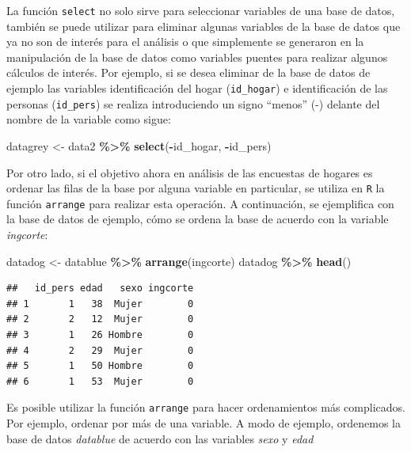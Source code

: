 \documentclass[
  12pt,
]{book}
\newenvironment{Shaded}{\begin{snugshade}}{\end{snugshade}}
\newcommand{\FunctionTok}[1]{\textcolor[rgb]{0.13,0.29,0.53}{\textbf{#1}}}
\newcommand{\NormalTok}[1]{#1}
\newcommand{\OtherTok}[1]{\textcolor[rgb]{0.56,0.35,0.01}{#1}}
\newcommand{\SpecialCharTok}[1]{\textcolor[rgb]{0.81,0.36,0.00}{\textbf{#1}}}
\begin{document}
La función \texttt{select} no solo sirve para seleccionar variables de una base de datos, también se puede utilizar para eliminar algunas variables de la base de datos que ya no son de interés para el análisis o que simplemente se generaron en la manipulación de la base de datos como variables puentes para realizar algunos cálculos de interés. Por ejemplo, si se desea eliminar de la base de datos de ejemplo las variables identificación del hogar (\texttt{id\_hogar}) e identificación de las personas (\texttt{id\_pers}) se realiza introduciendo un signo ``menos'' (-) delante del nombre de la variable como sigue:

\begin{Shaded}
\begin{Highlighting}[]
\NormalTok{datagrey }\OtherTok{\textless{}{-}}\NormalTok{ data2 }\SpecialCharTok{\%\textgreater{}\%} \FunctionTok{select}\NormalTok{(}\SpecialCharTok{{-}}\NormalTok{id\_hogar, }\SpecialCharTok{{-}}\NormalTok{id\_pers)}
\end{Highlighting}
\end{Shaded}

Por otro lado, si el objetivo ahora en análisis de las encuestas de hogares es ordenar las filas de la base por alguna variable en particular, se utiliza en \texttt{R} la función \texttt{arrange} para realizar esta operación. A continuación, se ejemplifica con la base de datos de ejemplo, cómo se ordena la base de acuerdo con la variable \emph{ingcorte}:

\begin{Shaded}
\begin{Highlighting}[]
\NormalTok{datadog }\OtherTok{\textless{}{-}}\NormalTok{ datablue }\SpecialCharTok{\%\textgreater{}\%} \FunctionTok{arrange}\NormalTok{(ingcorte)}
\NormalTok{datadog }\SpecialCharTok{\%\textgreater{}\%} \FunctionTok{head}\NormalTok{()}
\end{Highlighting}
\end{Shaded}

\begin{verbatim}
##   id_pers edad   sexo ingcorte
## 1       1   38  Mujer        0
## 2       2   12  Mujer        0
## 3       1   26 Hombre        0
## 4       2   29  Mujer        0
## 5       1   50 Hombre        0
## 6       1   53  Mujer        0
\end{verbatim}

Es posible utilizar la función \texttt{arrange} para hacer ordenamientos más complicados. Por ejemplo, ordenar por más de una variable. A modo de ejemplo, ordenemos la base de datos \emph{datablue} de acuerdo con las variables \emph{sexo} y \emph{edad}
\end{document}
